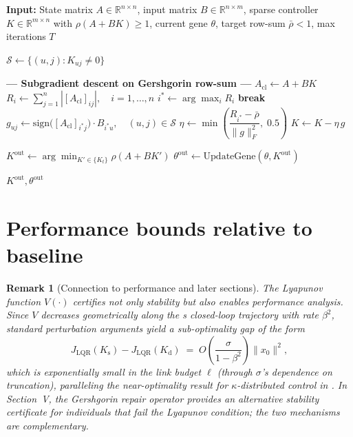 \documentclass[conference]{IEEEtran}
\newtheorem{remark}{Remark}
\begin{document}
\begin{algorithm}%
\caption{Gershgorin Stability Repair}
\label{alg:gers-repair}
\begin{algorithmic}[1]
\State \textbf{Input:} State matrix $A \in \mathbb{R}^{n \times n}$, input matrix $B \in \mathbb{R}^{n \times m}$, 
sparse controller $K \in \mathbb{R}^{m \times n}$ with $\rho(A+BK) \geq 1$, 
current gene $\theta$, target row-sum $\bar{\rho} < 1$, max iterations $T$

\State $\mathcal{S} \gets \{(u,j) : K_{uj} \neq 0\}$ 

\Statex
\Statex \textbf{--- Subgradient descent on Gershgorin row-sum ---}
    \State $A_{\mathrm{cl}} \gets A + BK$
    \State $R_i \gets \sum_{j=1}^{n} |[A_{\mathrm{cl}}]_{ij}|, \quad i = 1,\ldots,n$ 
    \State $i^* \gets \arg\max_i R_i$
        \textbf{break} 
    \EndIf
    \State $g_{uj} \gets \mathrm{sign}\bigl([A_{\mathrm{cl}}]_{i^* j}\bigr) \cdot B_{i^* u}, \quad (u,j) \in \mathcal{S}$ 
    \State $\eta \gets \min\!\left(\dfrac{R_{i^*} - \bar{\rho}}{\|g\|_F^2},\; 0.5\right)$ 
    \State $K \gets K - \eta \, g$
\EndFor

\State $K^{\mathrm{out}} \gets \arg\min_{K' \in \{K_t\}} \rho(A + BK')$ 
\State $\theta^{\mathrm{out}} \gets \mathrm{UpdateGene}(\theta, K^{\mathrm{out}})$ 

\State \Return $K^{\mathrm{out}}, \theta^{\mathrm{out}}$
\end{algorithmic}
\end{algorithm}


\section{Performance bounds relative to baseline}
\label{sec:perf-bounds}


\begin{remark}[Connection to performance and later sections]
\label{rem:perf-connection}
The Lyapunov function $V(\cdot)$ certifies not only stability
but also enables performance analysis.  Since $V$ decreases
geometrically along the s closed-loop trajectory with
rate $\beta^{2}$, standard perturbation arguments yield a
sub-optimality gap of the form
\[
  J_{\mathrm{LQR}}(K_{\mathrm{s}})
  - J_{\mathrm{LQR}}(K_{\mathrm{d}})
  \;=\; O\!\left(\frac{\sigma}{1-\beta^{2}}\right)\|x_{0}\|^{2},
\]
which is exponentially small in the link budget $\ell$
(through $\sigma$'s dependence on truncation),
paralleling the near-optimality result for
$\kappa$-distributed control
in \cite[Theorem~4.2]{shin}.
In Section~V, the Gershgorin repair operator provides an
alternative stability certificate for individuals that
fail the Lyapunov condition; the two mechanisms are
complementary.
\end{remark}
\end{document}
